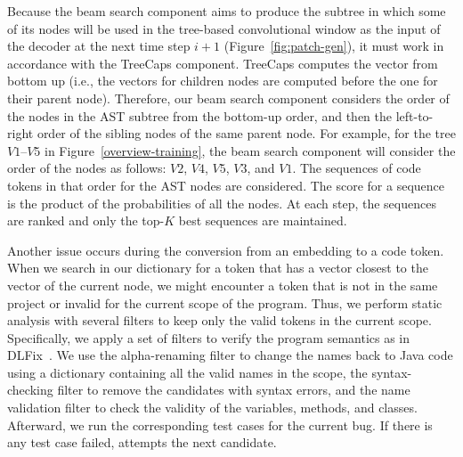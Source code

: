 Because the beam search component aims to produce the subtree
in which some of its nodes will be used in the tree-based convolutional
window as the input of the decoder at the next time step $i+1$
(Figure~\ref{fig:patch-gen}), it must work in accordance with the
TreeCaps component. TreeCaps computes the vector from bottom up (i.e.,
the vectors for children nodes are computed before the one for their
parent node). Therefore, our beam search component considers the order
of the nodes in the AST subtree from the bottom-up order, and then the
left-to-right order of the sibling nodes of the same parent node. For
example, for the tree $V1$--$V5$ in Figure~\ref{overview-training},
the beam search component will consider the order of the nodes as
follows: $V2$, $V4$, $V5$, $V3$, and $V1$. The sequences of code
tokens in that order for the AST nodes are considered. The score for a
sequence is the product of the probabilities of all the nodes. At each
step, the sequences are ranked and only the top-$K$ best sequences are
maintained.

Another issue occurs during the conversion from an embedding to a code
token. When we search in our dictionary for a token that has a vector
closest to the vector of the current node, we
might encounter a token that is not in the same project or invalid for
the current scope of the program. Thus, we perform static analysis
with several filters to keep only the valid tokens in the current
scope. Specifically, we apply a set of filters to verify the program
semantics as in DLFix~\cite{icse20}. We use the alpha-renaming filter
to change the names back to Java code using a dictionary
containing all the valid names in the scope, the syntax-checking
filter to remove the candidates with syntax errors, and the name
validation filter to check the validity of the variables, methods, and
classes.
Afterward, we run the corresponding test cases for the current
bug. If there is any test case failed, {\tool} attempts the next
candidate.



